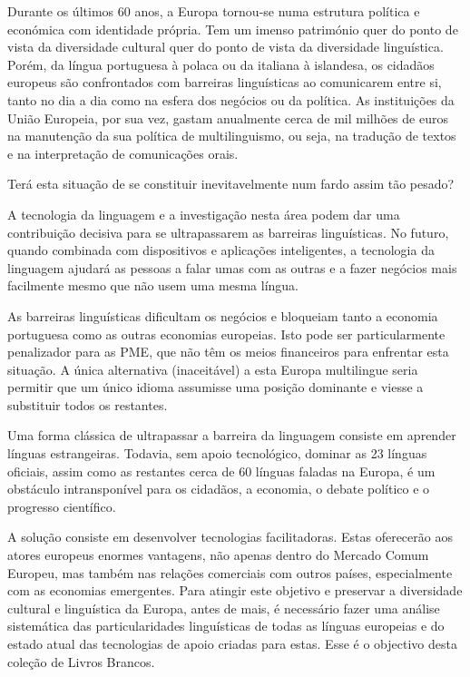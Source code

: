 \begin{multicols}{2}
Durante os últimos 60 anos, a Europa tornou-se numa estrutura política e económica com identidade própria.
Tem um imenso património quer do ponto de vista da diversidade cultural quer do ponto de vista da diversidade linguística. 
Porém, da língua portuguesa à polaca ou da italiana à islandesa, os cidadãos europeus são confrontados com barreiras linguísticas ao comunicarem entre si, tanto no dia a dia como na esfera dos negócios ou da política. As instituições da União Europeia, por sua vez, gastam anualmente
cerca de mil milhões de euros na manutenção da sua política de multilinguismo, ou seja, na tradução de textos e na interpretação de comunicações orais. 

Terá esta situação de se constituir inevitavelmente num fardo assim tão pesado?

A tecnologia da linguagem e a investigação nesta área podem dar uma contribuição decisiva para se ultrapassarem as barreiras linguísticas. 
No futuro, quando combinada com dispositivos e aplicações inteligentes, a tecnologia da linguagem ajudará
as pessoas a falar umas com as outras e a fazer negócios mais facilmente mesmo que não usem uma mesma língua.


As barreiras linguísticas dificultam os negócios e bloqueiam tanto a economia portuguesa como as outras economias europeias. 
Isto pode ser particularmente penalizador para as PME, que não têm os meios financeiros para enfrentar esta situação. 
A única alternativa (inaceitável) a esta Europa multilingue seria permitir que um único idioma assumisse uma posição dominante e viesse a substituir todos os restantes.

Uma forma clássica de ultrapassar a barreira da linguagem consiste em aprender línguas estrangeiras. 
Todavia, sem apoio tecnológico, dominar as 23 línguas oficiais, assim como as restantes cerca de 60 línguas faladas na Europa, 
é um obs\-tá\-cu\-lo intransponível para os cidadãos, a economia, o debate político e o progresso científico.

A solução consiste em desenvolver tecnologias facilitadoras. Estas oferecerão aos atores europeus enormes vantagens, não apenas dentro do Mercado Comum Europeu, mas também nas relações comerciais com outros países, especialmente com as economias emergentes. Para atingir este objetivo e preservar a diversidade cultural e linguística da Europa, antes de mais, é necessário fazer uma análise sistemática das particularidades linguísticas de todas as línguas europeias e do estado atual das tecnologias de apoio criadas para estas. Esse é o objectivo desta coleção de Livros Brancos.




\end{multicols}
